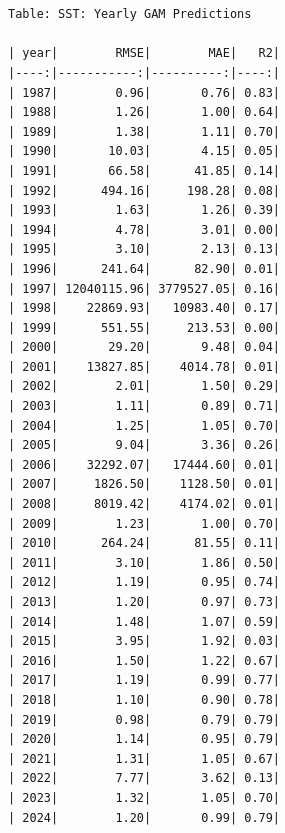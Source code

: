 \documentclass[letterpaper,9pt,twocolumn,twoside,]{pinp}
\begin{document}
\begin{ShadedResult}
\begin{verbatim}


Table: SST: Yearly GAM Predictions

| year|        RMSE|        MAE|   R2|
|----:|-----------:|----------:|----:|
| 1987|        0.96|       0.76| 0.83|
| 1988|        1.26|       1.00| 0.64|
| 1989|        1.38|       1.11| 0.70|
| 1990|       10.03|       4.15| 0.05|
| 1991|       66.58|      41.85| 0.14|
| 1992|      494.16|     198.28| 0.08|
| 1993|        1.63|       1.26| 0.39|
| 1994|        4.78|       3.01| 0.00|
| 1995|        3.10|       2.13| 0.13|
| 1996|      241.64|      82.90| 0.01|
| 1997| 12040115.96| 3779527.05| 0.16|
| 1998|    22869.93|   10983.40| 0.17|
| 1999|      551.55|     213.53| 0.00|
| 2000|       29.20|       9.48| 0.04|
| 2001|    13827.85|    4014.78| 0.01|
| 2002|        2.01|       1.50| 0.29|
| 2003|        1.11|       0.89| 0.71|
| 2004|        1.25|       1.05| 0.70|
| 2005|        9.04|       3.36| 0.26|
| 2006|    32292.07|   17444.60| 0.01|
| 2007|     1826.50|    1128.50| 0.01|
| 2008|     8019.42|    4174.02| 0.01|
| 2009|        1.23|       1.00| 0.70|
| 2010|      264.24|      81.55| 0.11|
| 2011|        3.10|       1.86| 0.50|
| 2012|        1.19|       0.95| 0.74|
| 2013|        1.20|       0.97| 0.73|
| 2014|        1.48|       1.07| 0.59|
| 2015|        3.95|       1.92| 0.03|
| 2016|        1.50|       1.22| 0.67|
| 2017|        1.19|       0.99| 0.77|
| 2018|        1.10|       0.90| 0.78|
| 2019|        0.98|       0.79| 0.79|
| 2020|        1.14|       0.95| 0.79|
| 2021|        1.31|       1.05| 0.67|
| 2022|        7.77|       3.62| 0.13|
| 2023|        1.32|       1.05| 0.70|
| 2024|        1.20|       0.99| 0.79|

\end{verbatim}
\end{ShadedResult}
\end{document}
